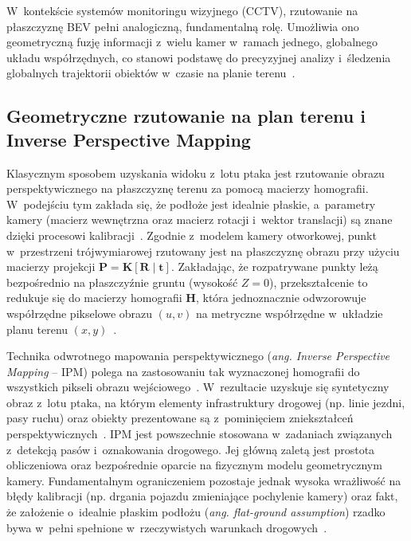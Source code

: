 W~kontekście systemów monitoringu wizyjnego (CCTV), rzutowanie na płaszczyznę BEV pełni
analogiczną, fundamentalną rolę. Umożliwia ono geometryczną fuzję informacji z~wielu kamer w~ramach
jednego, globalnego układu współrzędnych, co stanowi podstawę do precyzyjnej analizy i~śledzenia
globalnych trajektorii obiektów w~czasie na planie terenu~\cite{fleuret2008}.

\subsection{Geometryczne rzutowanie na plan terenu i Inverse Perspective Mapping}

Klasycznym sposobem uzyskania widoku z~lotu ptaka jest rzutowanie obrazu perspektywicznego na
płaszczyznę terenu za pomocą macierzy homografii. W~podejściu tym zakłada się, że podłoże jest
idealnie płaskie, a~parametry kamery (macierz wewnętrzna oraz macierz rotacji i~wektor translacji)
są znane dzięki procesowi kalibracji~\cite{hartleyzisserman, szeliski2022}. Zgodnie z~modelem
kamery otworkowej, punkt w~przestrzeni trójwymiarowej rzutowany jest na płaszczyznę obrazu przy
użyciu macierzy projekcji $\mathbf{P} = \mathbf{K}[\mathbf{R} \mid \mathbf{t}]$. Zakładając, że
rozpatrywane punkty leżą bezpośrednio na płaszczyźnie gruntu (wysokość $Z=0$), przekształcenie to
redukuje się do macierzy homografii $\mathbf{H}$, która jednoznacznie odwzorowuje współrzędne
pikselowe obrazu $(u, v)$ na metryczne współrzędne w~układzie planu terenu $(x,
  y)$~\cite{hartleyzisserman, szeliski2022}.

Technika odwrotnego mapowania perspektywicznego (\textit{ang. Inverse Perspective Mapping} -- IPM)
polega na zastosowaniu tak wyznaczonej homografii do wszystkich pikseli obrazu
wejściowego~\cite{li2023}. W~rezultacie uzyskuje się syntetyczny obraz z~lotu ptaka, na którym
elementy infrastruktury drogowej (np. linie jezdni, pasy ruchu) oraz obiekty prezentowane są
z~pominięciem zniekształceń perspektywicznych~\cite{jeong2016}. IPM jest powszechnie stosowana
w~zadaniach związanych z~detekcją pasów i~oznakowania drogowego. Jej główną zaletą jest prostota
obliczeniowa oraz bezpośrednie oparcie na fizycznym modelu geometrycznym kamery. Fundamentalnym
ograniczeniem pozostaje jednak wysoka wrażliwość na błędy kalibracji (np. drgania pojazdu
zmieniające pochylenie kamery) oraz fakt, że założenie o~idealnie płaskim podłożu (\textit{ang.
  flat-ground assumption}) rzadko bywa w~pełni spełnione w~rzeczywistych warunkach
drogowych~\cite{jeong2016, li2023}.

